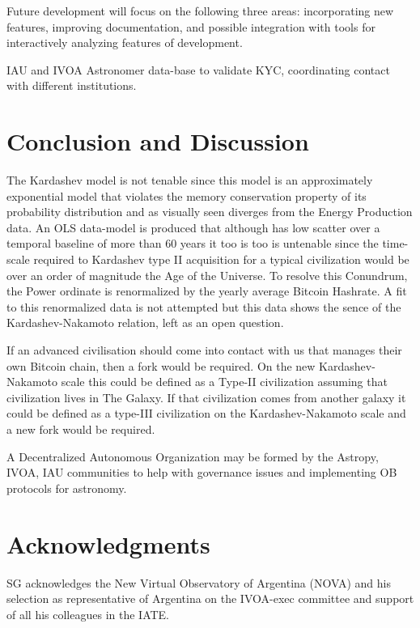 \documentclass[final,5p,times,twocolumn,authoryear]{elsarticle}
\begin{document}
Future development will focus on the following three areas: incorporating
new features, improving documentation, and 
possible integration with tools for interactively analyzing features of development.

IAU and IVOA Astronomer data-base to validate KYC, coordinating contact with different institutions. 

\section{Conclusion and Discussion}
\label{sec:conc}
The Kardashev model is not tenable since this model is an approximately exponential model that violates the memory conservation property of its probability distribution and as visually seen diverges from the Energy Production data. An OLS data-model is produced that although has low scatter over a temporal baseline of more than 60 years it too is too is untenable since the time-scale required to Kardashev type II acquisition for a typical civilization would be over an order of magnitude the Age of the Universe. To resolve this Conundrum, the Power ordinate is renormalized by the yearly average Bitcoin Hashrate. A fit to this renormalized data is not attempted but this data shows the sence of the Kardashev-Nakamoto relation, left as an open question. 

If an advanced civilisation should come into contact with us that manages their own Bitcoin chain, then a fork would be required. On the new Kardashev-Nakamoto scale this could be defined as a Type-II civilization assuming that civilization lives in The Galaxy. If that civilization comes from another galaxy it could be defined as a type-III civilization on the Kardashev-Nakamoto scale and a new fork would be required.

A Decentralized Autonomous Organization may be formed by the Astropy, IVOA, IAU communities to help with governance issues and implementing OB protocols for astronomy.
\section{Acknowledgments}
SG acknowledges the New Virtual Observatory of Argentina (NOVA) and his selection as representative of Argentina on the IVOA-exec committee and support of all his colleagues in the IATE.

%


\end{document}
